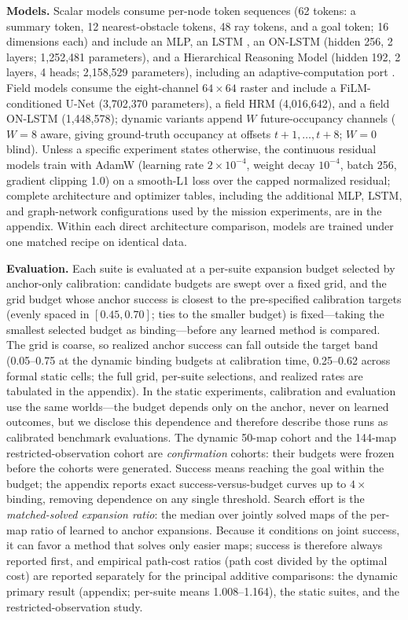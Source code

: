 \documentclass[letterpaper]{article} %
\begin{document}
\textbf{Models.} Scalar models consume per-node token sequences (62 tokens: a summary token, 12 nearest-obstacle tokens, 48 ray tokens, and a goal token; 16 dimensions each) and include an MLP, an LSTM \citep{hochreiter1997lstm}, an ON-LSTM \citep{shen2019onlstm} (hidden 256, 2 layers; 1{,}252{,}481 parameters), and a Hierarchical Reasoning Model \citep[HRM;][]{wang2025hrm} (hidden 192, 2 layers, 4 heads; 2{,}158{,}529 parameters), including an adaptive-computation port \citep{graves2016act,banino2021pondernet}. Field models consume the eight-channel $64{\times}64$ raster and include a FiLM-conditioned U-Net \citep{ronneberger2015unet,perez2018film} (3{,}702{,}370 parameters), a field HRM (4{,}016{,}642), and a field ON-LSTM (1{,}448{,}578); dynamic variants append $W$ future-occupancy channels ($W{=}8$ aware, giving ground-truth occupancy at offsets $t{+}1,\ldots,t{+}8$; $W{=}0$ blind). Unless a specific experiment states otherwise, the continuous residual models train with AdamW (learning rate $2{\times}10^{-4}$, weight decay $10^{-4}$, batch 256, gradient clipping 1.0) on a smooth-L1 loss over the capped normalized residual; complete architecture and optimizer tables, including the additional MLP, LSTM, and graph-network configurations used by the mission experiments, are in the appendix. Within each direct architecture comparison, models are trained under one matched recipe on identical data.

\textbf{Evaluation.} Each suite is evaluated at a per-suite expansion budget selected by anchor-only calibration: candidate budgets are swept over a fixed grid, and the grid budget whose anchor success is closest to the pre-specified calibration targets (evenly spaced in $[0.45, 0.70]$; ties to the smaller budget) is fixed---taking the smallest selected budget as binding---before any learned method is compared. The grid is coarse, so realized anchor success can fall outside the target band (0.05--0.75 at the dynamic binding budgets at calibration time, 0.25--0.62 across formal static cells; the full grid, per-suite selections, and realized rates are tabulated in the appendix). In the static experiments, calibration and evaluation use the same worlds---the budget depends only on the anchor, never on learned outcomes, but we disclose this dependence and therefore describe those runs as calibrated benchmark evaluations. The dynamic 50-map cohort and the 144-map restricted-observation cohort are \emph{confirmation} cohorts: their budgets were frozen before the cohorts were generated. Success means reaching the goal within the budget; the appendix reports exact success-versus-budget curves up to $4\times$ binding, removing dependence on any single threshold. Search effort is the \emph{matched-solved expansion ratio}: the median over jointly solved maps of the per-map ratio of learned to anchor expansions. Because it conditions on joint success, it can favor a method that solves only easier maps; success is therefore always reported first, and empirical path-cost ratios (path cost divided by the optimal cost) are reported separately for the principal additive comparisons: the dynamic primary result (appendix; per-suite means 1.008--1.164), the static suites, and the restricted-observation study.
\end{document}
